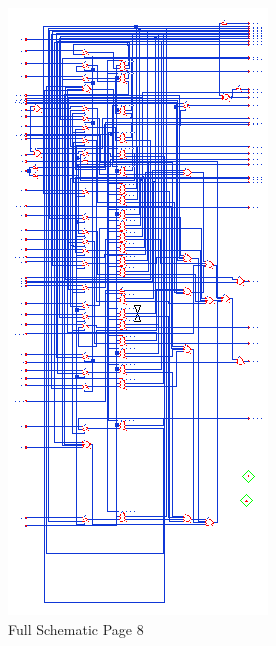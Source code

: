 \documentclass[11pt]{article}
\begin{document}
		
		\begin{figure}[H] 
			\centering 
			\includegraphics[width=\textwidth,height=\dimexpr\textheight-4\baselineskip-\abovecaptionskip-\belowcaptionskip\relax,keepaspectratio]{"Pictures/Full Schematic Page 8"}
			\caption{Full Schematic Page 8} 
			\label{fig:Full-Schematic-Page-8} 
		\end{figure}
		
\end{document}
